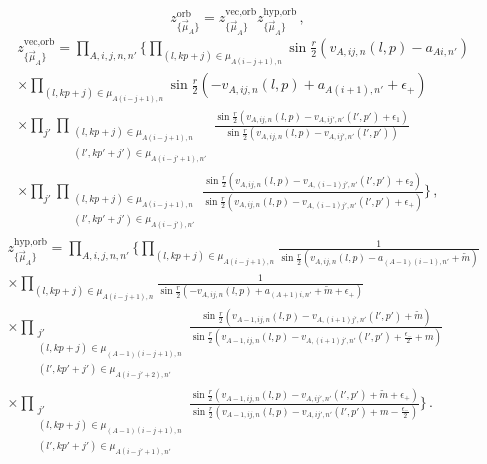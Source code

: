 \documentclass[main.tex]{subfiles}
\begin{document}
\begin{equation}
z^{\text{orb}}_{\{\vec\mu_A\}}=z^{\text{vec},\text{orb}}_{\{\vec\mu_A\}}z^{\text{hyp},\text{orb}}_{\{\vec\mu_A\}}\,,
\end{equation}
\begin{equation}
\begin{aligned}
&z^{\text{vec},\text{orb}}_{\{\vec\mu_A\}}=\prod_{A,i,j,n,n'}\Bigg\{\prod_{(l,kp+j)\in\mu_{A(i-j+1),n}}\sin\frac{r}{2}\left(v_{A,ij,n}(l,p)-a_{Ai,n'}\right)\\
&\times\prod_{(l,kp+j)\in\mu_{A(i-j+1),n}}\sin\frac{r}{2}\left(-v_{A,ij,n}(l,p)+a_{A(i+1),n'}+\epsilon_+\right)\\
&\times\prod_{j'}\prod_{\substack{(l,kp+j)\in\mu_{A(i-j+1),n}\\(l',kp'+j')\in\mu_{A(i-j'+1),n'}}}\frac{\sin\frac{r}{2}\left(v_{A,ij,n}(l,p)-v_{A,ij',n'}(l',p')+\epsilon_1\right)}{\sin\frac{r}{2}\left(v_{A,ij,n}(l,p)-v_{A,ij',n'}(l',p')\right)}\\
&\times\prod_{j'}\prod_{\substack{{(l,kp+j)\in\mu_{A(i-j+1),n}}\\(l',kp'+j')\in\mu_{A(i-j'),n'}}}\frac{\sin\frac{r}{2}\left(v_{A,ij,n}(l,p)-v_{A,(i-1)j',n'}(l',p')+\epsilon_2\right)}{\sin\frac{r}{2}\left(v_{A,ij,n}(l,p)-v_{A,(i-1)j',n'}(l',p')+\epsilon_+\right)}\Bigg\}\,,
\end{aligned}
\end{equation}
\begin{equation}
\begin{aligned}
&z^{\text{hyp},\text{orb}}_{\{\vec\mu_A\}}=\prod_{A,i,j,n,n'}\Bigg\{\prod_{(l,kp+j)\in\mu_{A(i-j+1),n}}\frac{1}{\sin\frac{r}{2}\left(v_{A,ij,n}(l,p)-a_{(A-1)(i-1),n'}+\tilde{m}\right)}\\
&\times\prod_{(l,kp+j)\in\mu_{A(i-j+1),n}}\frac{1}{\sin\frac{r}{2}\left(-v_{A,ij,n}(l,p)+a_{(A+1)i,n'}+\tilde{m}+\epsilon_+\right)}\\
&\times\prod_{\substack{j'\\(l,kp+j)\in\mu_{(A-1)(i-j+1),n}\\(l',kp'+j')\in\mu_{A(i-j'+2),n'}}}\frac{\sin\frac{r}{2}\left(v_{A-1,ij,n}(l,p)-v_{A,(i+1)j',n'}(l',p')+\tilde{m}\right)}{\sin\frac{r}{2}\left(v_{A-1,ij,n}(l,p)-v_{A,(i+1)j',n'}(l',p')+\frac{\epsilon_-}{2}+m\right)}\\
&\times\prod_{\substack{j'\\(l,kp+j)\in\mu_{(A-1)(i-j+1),n}\\(l',kp'+j')\in\mu_{A(i-j'+1),n'}}}\frac{\sin\frac{r}{2}\left(v_{A-1,ij,n}(l,p)-v_{A,ij',n'}(l',p')+\tilde{m}+\epsilon_+\right)}{\sin\frac{r}{2}\left(v_{A-1,ij,n}(l,p)-v_{A,ij',n'}(l',p')+m-\frac{\epsilon_-}{2}\right)}\Bigg\}\,.
\end{aligned}
\end{equation}
\end{document}

